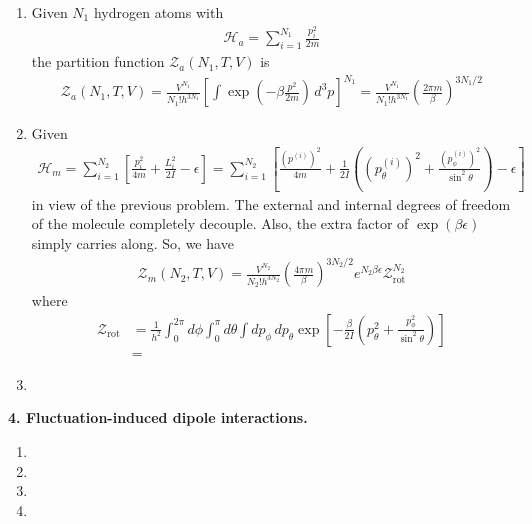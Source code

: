 \documentclass{article}
\theoremstyle{definition}
\newcommand{\ham}{\mathcal{H}}
\newcommand{\be}{\beta}
\newcommand{\f}[2]{\frac{#1}{#2}}
\newcommand{\lp}{\left(}
\newcommand{\rp}{\right)}
\newcommand{\lb}{\left[}
\newcommand{\rb}{\right]}
\begin{document}
\begin{enumerate}[label=(\alph*)]
	\item Given $N_1$ hydrogen atoms with
	\begin{align*}
	\ham_a = \sum^{N_1}_{i=1} \f{p_i^2}{2m}
	\end{align*}
	the partition function $\mathcal{Z}_a(N_1,T,V)$ is 
	\begin{align*}
	\mathcal{Z}_a(N_1,T,V) = \f{V^{N_1}}{N_1!h^{3N_1}}\lb \int \exp(-\be \f{p^2}{2m}) \,d^3p\rb^{N_1} = {\f{V^{N_1}}{N_1! h^{3N_1}} \lp \f{2\pi m}{\be} \rp^{3N_1/2}}
	\end{align*}
	
	\item Given 
	\begin{align*}
	\ham_m = \sum_{i=1}^{N_2} \lb \f{p_i^2}{4m} + \f{L_i^2}{2I} -\epsilon  \rb = \sum_{i=1}^{N_2} \lb \f{(p^{(i)})^2}{4m} + \f{1}{2I}\lp (p^{(i)}_\theta)^2 + \f{(p^{(i)}_\phi)^2}{\sin^2\theta} \rp -\epsilon  \rb
	\end{align*}
	in view of the previous problem. The external and internal degrees of freedom of the molecule completely decouple. Also, the extra factor of $\exp(\be\epsilon)$ simply carries along. So, we have
	\begin{align*}
	\mathcal{Z}_m(N_2,T,V) = {\f{V^{N_2}}{N_2! h^{3N_2}} \lp \f{4\pi m}{\be} \rp^{3N_2/2}} e^{N_2\be\epsilon} \mathcal{Z}_\text{rot}^{N_2}
	\end{align*}
	where
	\begin{align*}
	\mathcal{Z}_\text{rot} 
	&= 
	 \f{1}{h^2}\int^{2\pi}_0 d\phi \int^\pi_0 d\theta \int dp_\phi\,dp_\theta \exp\lb -\f{\be}{2I} \lp p^2_\theta + \f{p_\phi^2}{\sin^2\theta}\rp \rb\\
	&= 
	\end{align*}
	
	\item 
\end{enumerate}



\noindent \textbf{4. Fluctuation-induced dipole interactions.}

\begin{enumerate}[label=(\alph*)]
	\item 
	
	\item 
	
	\item 
	
	\item 
\end{enumerate}
\end{document}
